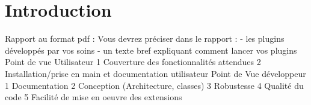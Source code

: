 \section{Introduction}


Rapport au format pdf : Vous devrez préciser dans le rapport :
- les plugins développés par vos soins
- un texte bref expliquant comment lancer vos plugins
Point de vue Utilisateur
1 Couverture des fonctionnalités attendues
2 Installation/prise en main et documentation utilisateur
Point de Vue développeur
1 Documentation
2 Conception (Architecture, classes)
3 Robustesse
4 Qualité du code
5 Facilité de mise en oeuvre des extensions
